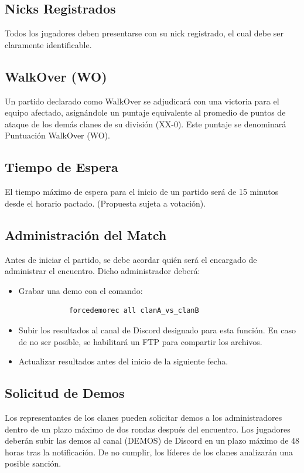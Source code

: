 \documentclass[a4paper, 11pt]{article}
\begin{document}
    \subsection{Nicks Registrados}
    Todos los jugadores deben presentarse con su nick registrado, el cual debe ser claramente identificable.

    \subsection{WalkOver (WO)}
    Un partido declarado como WalkOver se adjudicará con una victoria para el equipo afectado, asignándole un puntaje equivalente al promedio de puntos de ataque de los demás clanes de su división (XX-0). Este puntaje se denominará Puntuación WalkOver (WO).

    \subsection{Tiempo de Espera}
    El tiempo máximo de espera para el inicio de un partido será de 15 minutos desde el horario pactado. (Propuesta sujeta a votación).

    \subsection{Administración del Match}
    Antes de iniciar el partido, se debe acordar quién será el encargado de administrar el encuentro. Dicho administrador deberá:

    \begin{itemize}
        \item Grabar una demo con el comando:
        \begin{lstlisting}
            forcedemorec all clanA_vs_clanB
        \end{lstlisting}
        \item Subir los resultados al canal de Discord designado para esta función. En caso de no ser posible, se habilitará un FTP para compartir los archivos.
        \item Actualizar resultados antes del inicio de la siguiente fecha.
    \end{itemize}

    \subsection{Solicitud de Demos}
    Los representantes de los clanes pueden solicitar demos a los administradores dentro de un plazo máximo de dos rondas después del encuentro. Los jugadores deberán subir las demos al canal (DEMOS) de Discord en un plazo máximo de 48 horas tras la notificación. De no cumplir, los líderes de los clanes analizarán una posible sanción.
\end{document}
